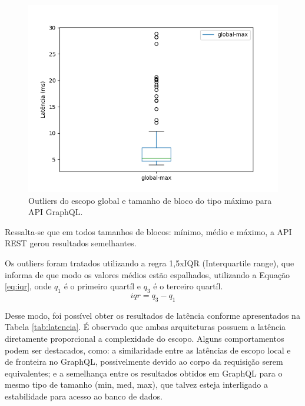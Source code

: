 \documentclass[conference]{IEEEtran}
\begin{document}
\begin{figure}[htbp]
\centerline{\includegraphics[scale=0.50]{imgs/graphql_time/global_graphql-max.png}}
\caption{Outliers do escopo global e tamanho de bloco do tipo máximo para API GraphQL.}
\label{fig:graphql_global_scope_max}
\end{figure}

Ressalta-se que em todos tamanhos de blocos: mínimo, médio e máximo, a API REST gerou resultados semelhantes.

Os outliers foram tratados utilizando a regra 1,5xIQR (Interquartile range), que informa de que modo os valores médios estão espalhados, utilizando a Equação \ref{eq:iqr}, onde $q_1$ é o primeiro quartíl e $q_3$ é o terceiro quartíl.
\begin{equation}
iqr = q_3 - q_1\label{eq:iqr}
\end{equation}

Desse modo, foi possível obter os resultados de latência conforme apresentados na Tabela \ref{tab:latencia}. É observado que ambas arquiteturas possuem a latência diretamente proporcional a complexidade do escopo. Alguns comportamentos podem ser destacados, como: a similaridade entre as latências de escopo local e de fronteira no GraphQL, possivelmente devido ao corpo da requisição serem equivalentes; e a semelhança entre os resultados obtidos em GraphQL para o mesmo tipo de tamanho (min, med, max), que talvez esteja interligado a estabilidade para acesso ao banco de dados.
 
\end{document}
